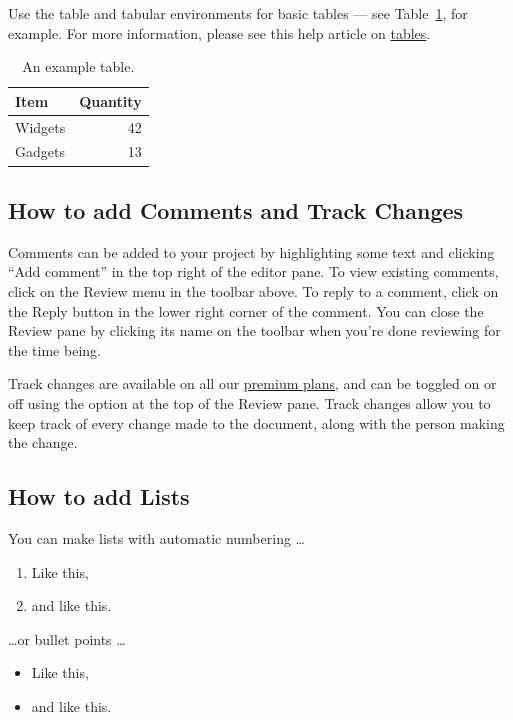 \documentclass[twocolumn]{ltjsarticle}
\begin{document}
		Use the table and tabular environments for basic tables --- see Table~\ref{tab:widgets}, for example. For more information, please see this help article on \href{https://www.overleaf.com/learn/latex/tables}{tables}.

		\begin{table}
			\centering
			\begin{tabular}{l|r}
				Item    & Quantity \\\hline
				Widgets & 42       \\
				Gadgets & 13
			\end{tabular}
			\caption{\label{tab:widgets}An example table.}
		\end{table}

	\subsection{How to add Comments and Track Changes}

		Comments can be added to your project by highlighting some text and clicking ``Add comment'' in the top right of the editor pane. To view existing comments, click on the Review menu in the toolbar above. To reply to a comment, click on the Reply button in the lower right corner of the comment. You can close the Review pane by clicking its name on the toolbar when you're done reviewing for the time being.

		Track changes are available on all our \href{https://www.overleaf.com/user/subscription/plans}{premium plans}, and can be toggled on or off using the option at the top of the Review pane. Track changes allow you to keep track of every change made to the document, along with the person making the change.

	\subsection{How to add Lists}

		You can make lists with automatic numbering \dots

		\begin{enumerate}
			\item Like this,
			\item and like this.
		\end{enumerate}
		\dots or bullet points \dots
		\begin{itemize}
			\item Like this,
			\item and like this.
		\end{itemize}
\end{document}
